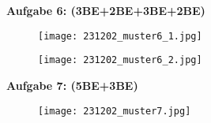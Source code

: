 \documentclass[a4paper,12pt]{article}
\newcommand{\Aufgabe}[1]{
  {
  \vspace*{0.5cm}
  \textsf{\textbf{Aufgabe #1}}
  \vspace*{0.2cm}
  
  }
}
\begin{document}
\Aufgabe{6: (3BE+2BE+3BE+2BE)}
  \begin{figure}[H]
    \vspace{0cm}
    \centering
    \texttt{[image: 231202\_muster6\_1.jpg]}
  \end{figure}
  \begin{figure}[H]
    \vspace{0cm}
    \centering
    \texttt{[image: 231202\_muster6\_2.jpg]}
  \end{figure}

\Aufgabe{7: (5BE+3BE)}
  \begin{figure}[H]
    \vspace{0cm}
    \centering
    \texttt{[image: 231202\_muster7.jpg]}
  \end{figure}
\end{document}
